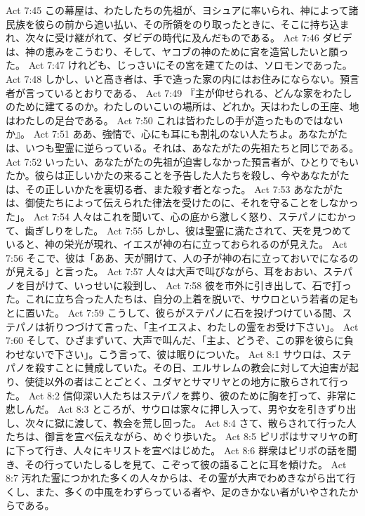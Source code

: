 Act 7:45  この幕屋は、わたしたちの先祖が、ヨシュアに率いられ、神によって諸民族を彼らの前から追い払い、その所領をのり取ったときに、そこに持ち込まれ、次々に受け継がれて、ダビデの時代に及んだものである。
Act 7:46  ダビデは、神の恵みをこうむり、そして、ヤコブの神のために宮を造営したいと願った。
Act 7:47  けれども、じっさいにその宮を建てたのは、ソロモンであった。
Act 7:48  しかし、いと高き者は、手で造った家の内にはお住みにならない。預言者が言っているとおりである、
Act 7:49  『主が仰せられる、どんな家をわたしのために建てるのか。わたしのいこいの場所は、どれか。天はわたしの王座、地はわたしの足台である。
Act 7:50  これは皆わたしの手が造ったものではないか』。
Act 7:51  ああ、強情で、心にも耳にも割礼のない人たちよ。あなたがたは、いつも聖霊に逆らっている。それは、あなたがたの先祖たちと同じである。
Act 7:52  いったい、あなたがたの先祖が迫害しなかった預言者が、ひとりでもいたか。彼らは正しいかたの来ることを予告した人たちを殺し、今やあなたがたは、その正しいかたを裏切る者、また殺す者となった。
Act 7:53  あなたがたは、御使たちによって伝えられた律法を受けたのに、それを守ることをしなかった」。
Act 7:54  人々はこれを聞いて、心の底から激しく怒り、ステパノにむかって、歯ぎしりをした。
Act 7:55  しかし、彼は聖霊に満たされて、天を見つめていると、神の栄光が現れ、イエスが神の右に立っておられるのが見えた。
Act 7:56  そこで、彼は「ああ、天が開けて、人の子が神の右に立っておいでになるのが見える」と言った。
Act 7:57  人々は大声で叫びながら、耳をおおい、ステパノを目がけて、いっせいに殺到し、
Act 7:58  彼を市外に引き出して、石で打った。これに立ち合った人たちは、自分の上着を脱いで、サウロという若者の足もとに置いた。
Act 7:59  こうして、彼らがステパノに石を投げつけている間、ステパノは祈りつづけて言った、「主イエスよ、わたしの霊をお受け下さい」。
Act 7:60  そして、ひざまずいて、大声で叫んだ、「主よ、どうぞ、この罪を彼らに負わせないで下さい」。こう言って、彼は眠りについた。
Act 8:1  サウロは、ステパノを殺すことに賛成していた。その日、エルサレムの教会に対して大迫害が起り、使徒以外の者はことごとく、ユダヤとサマリヤとの地方に散らされて行った。
Act 8:2  信仰深い人たちはステパノを葬り、彼のために胸を打って、非常に悲しんだ。
Act 8:3  ところが、サウロは家々に押し入って、男や女を引きずり出し、次々に獄に渡して、教会を荒し回った。
Act 8:4  さて、散らされて行った人たちは、御言を宣べ伝えながら、めぐり歩いた。
Act 8:5  ピリポはサマリヤの町に下って行き、人々にキリストを宣べはじめた。
Act 8:6  群衆はピリポの話を聞き、その行っていたしるしを見て、こぞって彼の語ることに耳を傾けた。
Act 8:7  汚れた霊につかれた多くの人々からは、その霊が大声でわめきながら出て行くし、また、多くの中風をわずらっている者や、足のきかない者がいやされたからである。
